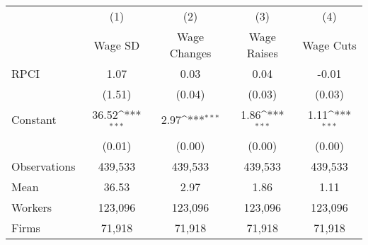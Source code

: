 {
\def\sym#1{\ifmmode^{#1}\else\(^{#1}\)\fi}
\begin{tabular}{l*{4}{c}}
\hline\hline
                    &\multicolumn{1}{c}{(1)}&\multicolumn{1}{c}{(2)}&\multicolumn{1}{c}{(3)}&\multicolumn{1}{c}{(4)}\\
                    &\multicolumn{1}{c}{Wage SD}&\multicolumn{1}{c}{Wage Changes}&\multicolumn{1}{c}{Wage Raises}&\multicolumn{1}{c}{Wage Cuts}\\
\hline
RPCI                &        1.07         &        0.03         &        0.04         &       -0.01         \\
                    &      (1.51)         &      (0.04)         &      (0.03)         &      (0.03)         \\
[1em]
Constant            &       36.52\sym{***}&        2.97\sym{***}&        1.86\sym{***}&        1.11\sym{***}\\
                    &      (0.01)         &      (0.00)         &      (0.00)         &      (0.00)         \\
\hline
Observations        &     439,533         &     439,533         &     439,533         &     439,533         \\
Mean                &       36.53         &        2.97         &        1.86         &        1.11         \\
Workers             &     123,096         &     123,096         &     123,096         &     123,096         \\
Firms               &      71,918         &      71,918         &      71,918         &      71,918         \\
\hline\hline
\end{tabular}
}
